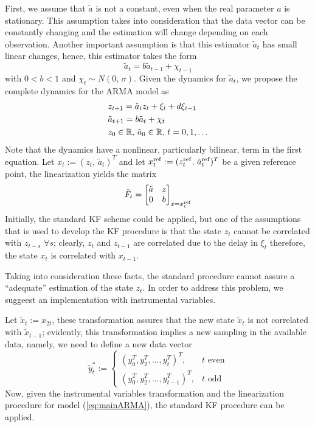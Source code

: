 First, we assume that $\tilde{a}$ is not a constant, even when the real parameter $a$ is stationary. This assumption takes into consideration that the data vector can be constantly changing and the estimation will change depending on each observation. Another important assumption is that this estimator $\tilde{a}_t$ has small linear changes, hence, this estimator takes the form
\begin{equation}
  \tilde{a}_t=b\tilde{a}_{t-1}+\chi_{t-1}
\end{equation}
with $0<b<1$ and $\chi_t \sim N(0,\,\sigma)$. Given the dynamics for $\tilde{a}_t$, we propose the complete dynamics for the ARMA model as
\begin{equation}\label{eq:mainARMA}
  \begin{split}
    &z_{t+1}=\tilde{a}_tz_t+\xi_t+d\xi_{t-1}\\
    &\tilde{a}_{t+1}=b\tilde{a}_t+\chi_t\\
    &z_0\in\R,\,\tilde{a}_0\in\R,\,t=0,1,\dots
  \end{split}
\end{equation}
Note that the dynamics have a nonlinear, particularly bilinear, term in the first equation. Let $x_t:=(z_t,\,\tilde{a}_t)^T$ and let $x^{{\rm ref}}_t:=(z_t^{{\rm ref}},\,\tilde{a}_t^{{\rm ref}})^T$ be a given reference point, the linearization yields the matrix
\[
\tilde{F}_t = \begin{bmatrix}
\tilde{a} & z\\
0 & b
\end{bmatrix}_{x=x_t^{{\rm ref}}}
\]
Initially, the standard KF scheme could be applied, but one of the assumptions that is used to develop the KF procedure is that the state $z_t$ cannot be correlated with $z_{t-s}$ $\forall s$; clearly, $z_t$ and $z_{t-1}$ are correlated due to the delay in $\xi_t$ therefore, the state $x_t$ is correlated with $x_{t-1}$.

Taking into consideration these facts, the standard procedure cannot assure a ``adequate'' estimation of the state $z_t$. In order to address this problem, we suggeest an implementation with instrumental variables.

Let $\tilde{x}_t:=x_{2t}$, these transformation assures that the new state $\tilde{x}_t$ is not correlated with $\tilde{x}_{t-1}$; evidently, this transformation implies a new sampling in the available data, namely, we need to define a new data vector
 \[\tilde{y}_t^*:=\begin{cases}
   (y_0^T, y_2^T,\ldots,y_t^T)^T,&t\text{ even}\\
   (y_0^T, y_2^T,\ldots,y_{t-1}^T)^T,&t\text{ odd}
 \end{cases}\]
Now, given the instrumental variables transformation and the linearization procedure for model (\ref{eq:mainARMA}), the standard KF procedure can be applied.
